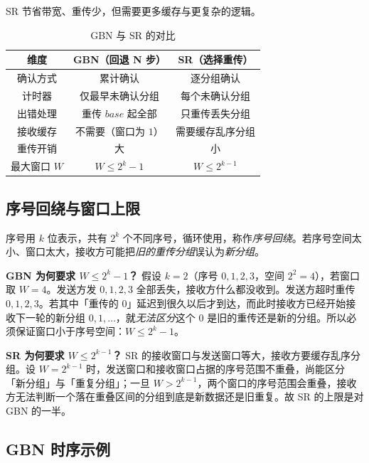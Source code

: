 SR 节省带宽、重传少，但需要更多缓存与更复杂的逻辑。

\begin{table}[H]
\centering
\caption{GBN 与 SR 的对比}
\begin{tabulary}{\textwidth}{CCC}
\toprule
维度 & GBN（回退 N 步） & SR（选择重传） \\
\midrule
确认方式 & 累计确认 & 逐分组确认 \\
计时器 & 仅最早未确认分组 & 每个未确认分组 \\
出错处理 & 重传 $base$ 起全部 & 只重传丢失分组 \\
接收缓存 & 不需要（窗口为 $1$） & 需要缓存乱序分组 \\
重传开销 & 大 & 小 \\
最大窗口 $W$ & $W \le 2^{k}-1$ & $W \le 2^{k-1}$ \\
\bottomrule
\end{tabulary}
\label{tab:gbn_sr}
\end{table}

\subsection{序号回绕与窗口上限}

序号用 $k$ 位表示，共有 $2^{k}$ 个不同序号，循环使用，称作\emph{序号回绕}。若序号空间太小、窗口太大，接收方可能把\emph{旧的重传分组}误认为\emph{新分组}。

\textbf{GBN 为何要求 $W \le 2^{k}-1$？} 假设 $k=2$（序号 $0,1,2,3$，空间 $2^2=4$），若窗口取 $W=4$。发送方发 $0,1,2,3$ 全部丢失，接收方什么都没收到。发送方超时重传 $0,1,2,3$。若其中「重传的 $0$」延迟到很久以后才到达，而此时接收方已经开始接收下一轮的新分组 $0,1,\dots$，就\emph{无法区分}这个 $0$ 是旧的重传还是新的分组。所以必须保证窗口小于序号空间：$W \le 2^{k}-1$。

\textbf{SR 为何要求 $W \le 2^{k-1}$？} SR 的接收窗口与发送窗口等大，接收方要缓存乱序分组。设 $W = 2^{k-1}$ 时，发送窗口和接收窗口占据的序号范围不重叠，尚能区分「新分组」与「重复分组」；一旦 $W > 2^{k-1}$，两个窗口的序号范围会重叠，接收方无法判断一个落在重叠区间的分组到底是新数据还是旧重复。故 SR 的上限是对 GBN 的一半。

\subsection{GBN 时序示例}


